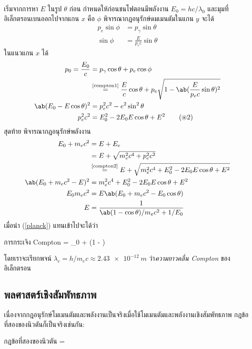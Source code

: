 \begin{soln}
    เริ่มจากการหา $E$ ในรูป $\theta$ ก่อน กำหนดให้ก่อนชนโฟตอนมีพลังงาน $E_0 = hc/\lambda_0$ และมุมที่อิเล็กตรอนเบนออกไปจากแกน $x$ คือ $\phi$ พิจารณากฎอนุรักษ์ดมเมนตัมในแกน $y$ จะได้
    \begin{align*}
        p_e\sin\phi &= p_\gamma\sin\theta \\
        \sin\phi &= \frac{E}{p_ec}\sin\theta\tag{$\circledast$1}\label{compton1}
    \end{align*}
    ในแนวแกน $x$ ได้
    \begin{align*}
        p_0 = \frac{E_0}{c} &= p_\gamma\cos\theta + p_e\cos\phi \\
        &\overset{\text{\ref{compton1}}}{=} \frac{E}{c}\cos\theta + p_e\sqrt{1 - \ab(\frac{E}{p_ec}\sin\theta)^2}\\
        \ab(E_0 - E\cos\theta)^2 &= p_e^2c^2 - e^2\sin^2\theta\\
        p_e^2c^2 &= E_0^2 -2E_0E\cos\theta + E^2\tag{$\circledast$2}\label{compton2}
    \end{align*}
    สุดท้าย พิจารณากฎอนุรักษ์พลังงาน
    \begin{align}
        E_0 + m_ec^2 &= E + E_e\notag\\
        &= E + \sqrt{m_e^2c^4 + p_e^2c^2}\notag\\
        &\overset{\text{\ref{compton2}}}{=} E + \sqrt{m_e^2c^4 + E_0^2 - 2E_0E\cos\theta + E^2}\notag\\
        \ab(E_0 + m_ec^2 - E)^2 &= m_e^2c^4 + E_0^2 - 2E_0E\cos\theta + E^2\notag\\
        E_0m_ec^2 &= E\ab(E_0 + m_ec^2 - E_0\cos\theta)\notag\\
        E &= \frac{1}{\ab(1 - \cos\theta)/m_ec^2 + 1/E_0}
    \end{align}
    เมื่อนำ (\ref{planck}) แทนเข้าไปจะได้ว่า
    \begin{eqbox}{การกระเจิง Compton}
        \lambda = \lambda_0 + \ab(1 - \cos\theta)
    \end{eqbox}
    โดยเราจะเรียกพจน์ $\lambda_c = h/m_ec \approx \qty{2.43e-12}{m}$ ว่า\emph{ความยาวคลื่น Compton} ของอิเล็กตรอน
\end{soln}

\subsection{พลศาสตร์เชิงสัมพัทธภาพ}

เนื่องจากกฎอนุรักษ์โมเมนตัมและพลังงานเป็นจริงเมื่อใช้โมเมนตัมและพลังงานเชิงสัมพัทธภาพ กฎข้อที่สองของนิวตันก็เป็นจริงเช่นกัน:
\begin{ieqbox}{กฎข้อที่สองของนิวตัน}
     = 
\end{ieqbox}